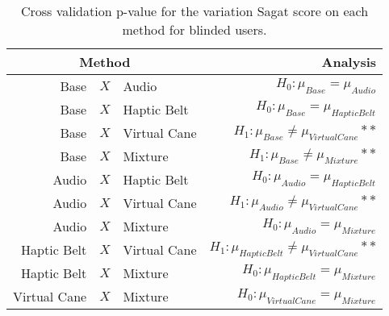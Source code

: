 
\begin{table}[!htb]
\centering
\caption{Cross validation p-value for the variation Sagat score on each method for blinded users.}
\label{tab:lsd_sagat_var}
\begin{tabular}{rclr}
\toprule
      \multicolumn{3}{c}{Method} &                                           Analysis \\
\midrule
              Base & $X$ & Audio &                   $H_0 : \mu_{Base} = \mu_{Audio}$ \\
        Base & $X$ & Haptic Belt &             $H_0 : \mu_{Base} = \mu_{Haptic Belt}$ \\
       Base & $X$ & Virtual Cane &        $H_1 : \mu_{Base} \ne \mu_{Virtual Cane}**$ \\
            Base & $X$ & Mixture &             $H_1 : \mu_{Base} \ne \mu_{Mixture}**$ \\
       Audio & $X$ & Haptic Belt &            $H_0 : \mu_{Audio} = \mu_{Haptic Belt}$ \\
      Audio & $X$ & Virtual Cane &       $H_1 : \mu_{Audio} \ne \mu_{Virtual Cane}**$ \\
           Audio & $X$ & Mixture &                $H_0 : \mu_{Audio} = \mu_{Mixture}$ \\
Haptic Belt & $X$ & Virtual Cane & $H_1 : \mu_{Haptic Belt} \ne \mu_{Virtual Cane}**$ \\
     Haptic Belt & $X$ & Mixture &          $H_0 : \mu_{Haptic Belt} = \mu_{Mixture}$ \\
    Virtual Cane & $X$ & Mixture &         $H_0 : \mu_{Virtual Cane} = \mu_{Mixture}$ \\
\bottomrule
\end{tabular}
\end{table}

